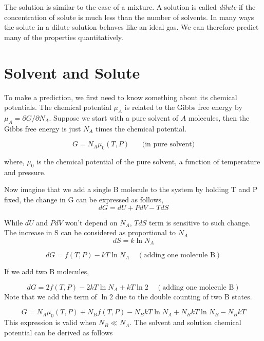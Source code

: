 
The solution is similar to the case of a mixture. A solution is called \textit{dilute} if the concentration of solute is much less than the number of solvents. In many ways the solute in a dilute solution behaves like an ideal gas. We can therefore predict many of the properties quantitatively.

\section{Solvent and Solute}
To make a prediction, we first need to know something about its chemical potentials. The chemical potential $\mu_A$ is related to the Gibbs free energy by $\mu_A = \partial G/\partial N_A$. Suppose we start with a pure solvent of $A$ molecules, then the Gibbs free energy is just $N_A$ times the chemical potential.

\begin{equation}
G = N_A\mu_0(T, P)  ~~~~~~~~ \textrm{(in pure solvent)}    
\end{equation}

where, $\mu_0$ is the chemical potential of the pure solvent, a function of temperature and pressure.

Now imagine that we add a single B molecule to the system by holding T and P fixed, the change in G can be expressed as follows,
\begin{equation}
dG = dU + PdV - TdS    
\end{equation}

While $dU$ and $PdV$ won't depend on $N_A$, $TdS$ term is sensitive to such change. The increase in S can be considered as proportional to $N_A$ 
\begin{equation}
dS = k\ln N_A     
\end{equation}

\begin{equation}
dG = f(T, P) - kT\ln N_A   ~~~~~(\textrm{adding one molecule B})  
\end{equation}

If we add two B molecules, 

\begin{equation}
dG = 2f(T, P) - 2kT\ln N_A + kT\ln2  ~~~~~(\textrm{adding one molecule B})  
\end{equation}
Note that we add the term of $\ln2$ due to the double counting of two B states.

\begin{equation}
G = N_A\mu_0(T, P) + N_Bf(T, P) - N_BkT\ln N_A  + N_BkT\ln N_B - N_BkT  
\end{equation}
This expression is valid when $N_B \ll N_A$. The solvent and solution chemical potential can be derived as follows

